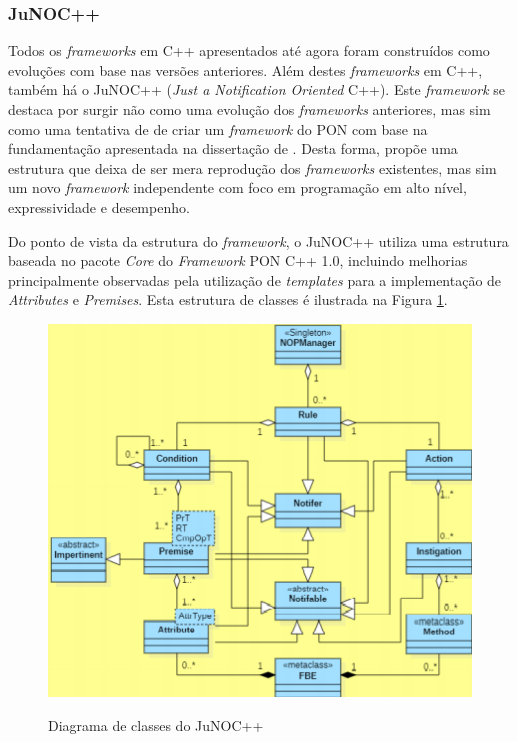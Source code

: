\subsubsection{JuNOC++}

Todos os \textit{frameworks} em C++ apresentados até agora foram construídos
como evoluções com base nas versões anteriores. Além destes \textit{frameworks}
em C++, também há o JuNOC++ (\textit{Just a Notification Oriented} C++). Este
\textit{framework} se destaca por surgir não como uma evolução dos
\textit{frameworks} anteriores, mas sim como uma tentativa de
 de criar um \textit{framework} do PON com base na
fundamentação apresentada na dissertação de .
Desta forma,  propõe uma estrutura que deixa de ser
mera reprodução dos \textit{frameworks} existentes, mas sim um novo
\textit{framework} independente com foco em programação em alto nível,
expressividade e desempenho.

Do ponto de vista da estrutura do \textit{framework}, o JuNOC++ utiliza uma
estrutura baseada no pacote \textit{Core} do \textit{Framework} PON C++ 1.0,
incluindo melhorias principalmente observadas pela utilização de
\textit{templates} para a implementação de \textit{Attributes} e
\textit{Premises}. Esta estrutura de classes é ilustrada na Figura
\ref{fig:class_junoc}.

\begin{figure}[!htb]
  \centering
  \caption{Diagrama de classes do JuNOC++}
  \includegraphics[width=.7\textwidth]{../figures/junoc_class.png}
  \label{fig:class_junoc}
\end{figure}

